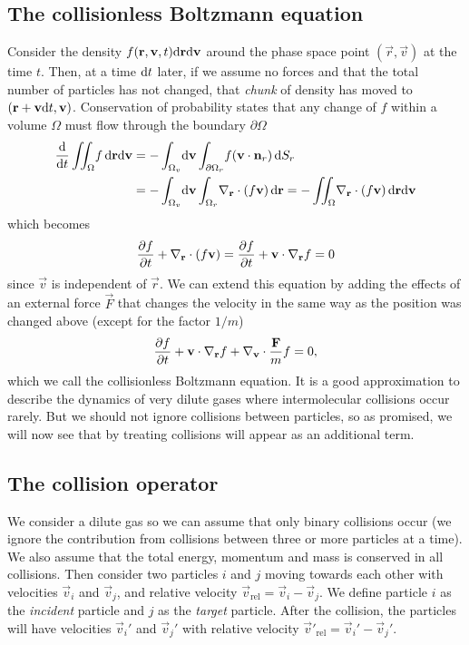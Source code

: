 \subsection{The collisionless Boltzmann equation}
Consider the density $f(\mathbf r, \mathbf v, t)\mathrm{d}\mathbf r\mathrm{d}\mathbf v$ around the phase space point $(\vec r,\vec v)$ at the time $t$. Then, at a time $\mathrm{d}t$ later, if we assume no forces and that the total number of particles has not changed, that \textit{chunk} of density has moved to $(\mathbf r + \mathbf v\mathrm{d}t, \mathbf v)$. Conservation of probability states that any change of $f$ within a volume $\Omega$ must flow through the boundary $\partial \Omega$
\begin{align}
	\frac{\dm }{\dm t}\iint_\Omega\! f\, \dm \vec r \dm \vec v &= -\int_{\Omega_v}\!\dm \vec v\int_{\partial \Omega_r}\! f(\vec v\cdot \vec n_r)\, \dm S_r\\
	&= -\int_{\Omega_v}\!\dm \vec v\int_{\Omega_r}\! \nabla_\vec r\cdot(f\vec v)\, \dm \vec r = -\iint_{\Omega}\! \nabla_\vec r\cdot(f\vec v)\, \dm \vec r\dm \vec v
\end{align}
which becomes
\begin{align}
	\frac{\partial f}{\partial t} + \nabla_\mathbf r \cdot(f\mathbf v) = \frac{\partial f}{\partial t} + \mathbf v\cdot\nabla_\mathbf r f = 0
\end{align}
since $\vec v$ is independent of $\vec r$. We can extend this equation by adding the effects of an external force $\vec F$ that changes the velocity in the same way as the position was changed above (except for the factor $1/m$)
\begin{align}
	\label{eq:collisionless_boltzmann}
	\frac{\partial f}{\partial t} + \mathbf v\cdot\nabla_\mathbf r f + \nabla_\mathbf v \cdot \frac{\mathbf F}{ m}f = 0,
\end{align}
which we call the collisionless Boltzmann equation. It is a good approximation to describe the dynamics of very dilute gases where intermolecular collisions occur rarely. But we should not ignore collisions between particles, so as promised, we will now see that by treating collisions will appear as an additional term.
\subsection{The collision operator}
\label{sec:boltzmann_collision_operator}
We consider a dilute gas so we can assume that only binary collisions occur (we ignore the contribution from collisions between three or more particles at a time). We also assume that the total energy, momentum and mass is conserved in all collisions. Then consider two particles $i$ and $j$ moving towards each other with velocities $\vec v_i$ and $\vec v_j$, and relative velocity $\vec v_\text{rel} = \vec v_i - \vec v_j$. We define particle $i$ as the \textit{incident} particle and $j$ as the \textit{target} particle. After the collision, the particles will have velocities $\vec v_i'$ and $\vec v_j'$ with relative velocity $\vec v'_\text{rel} = \vec v_i' - \vec v_j'$.

